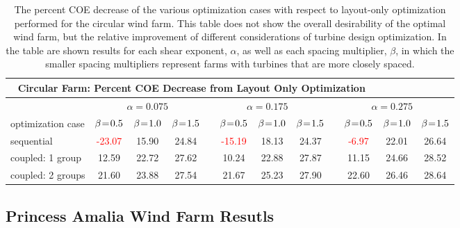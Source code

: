 \begin{center}
\begin{table}
\caption{The percent COE decrease of the various optimization cases with respect to layout-only optimization performed for the circular wind farm. This table does not show the overall desirability of the optimal wind farm, but the relative improvement of different considerations of turbine design optimization. In the table are shown results for each shear exponent, $\alpha$, as well as each spacing multiplier, $\beta$, in which the smaller spacing multipliers represent farms with turbines that are more closely spaced.}
\label{circular_table}
\begin{tabular}{p{2.5cm} c c c c c c c c c c c}
\hline
\multicolumn{10}{c}{\textbf{Circular Farm: Percent COE Decrease from Layout Only Optimization}}\\
\hline
 & \multicolumn{3}{c}{$\alpha=0.075$} & \multicolumn{4}{c}{$\alpha=0.175$} & \multicolumn{4}{c}{$\alpha=0.275$}\\
\hline
optimization case & $\beta\mkern1.5mu{=}\mkern1.5mu0.5$ & $\beta\mkern1.5mu{=}\mkern1.5mu1.0$ & $\beta\mkern1.5mu{=}\mkern1.5mu1.5$ & & $\beta\mkern1.5mu{=}\mkern1.5mu0.5$ & $\beta\mkern1.5mu{=}\mkern1.5mu1.0$ & $\beta\mkern1.5mu{=}\mkern1.5mu1.5$& &$\beta\mkern1.5mu{=}\mkern1.5mu0.5$ & $\beta\mkern1.5mu{=}\mkern1.5mu1.0$ & $\beta\mkern1.5mu{=}\mkern1.5mu1.5$\\
sequential & \textcolor{red}{-23.07} & 15.90 & 24.84 & & \textcolor{red}{-15.19}  & 18.13 & 24.37 & & \textcolor{red}{-6.97}  & 22.01 & 26.64\\
coupled: 1 group& 12.59  & 22.72  & 27.62  & & 10.24  & 22.88  & 27.87 & & 11.15 & 24.66 & 28.52 \\
coupled: 2 groups & 21.60  & 23.88  & 27.54 & & 21.67  & 25.23  &  27.90 & &  22.60 & 26.46  & 28.64\\
\hline
\end{tabular}
\end{table}
\end{center}




\subsection{Princess Amalia Wind Farm Resutls}


